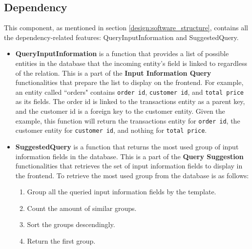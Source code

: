\subsection{Dependency}
\label{backend_dependency}
This component, as mentioned in section \ref{design:software_structure}, contains all the dependency-related features: QueryInputInformation and SuggestedQuery.
\begin{itemize}
    \item \textbf{QueryInputInformation} is a function that provides a list of possible entities in the database that the incoming entity's field is linked to regardless of the relation. This is a part of the \textbf{Input Information Query} functionalities that prepare the list to display on the frontend. For example, an entity called ``orders" contains \verb!order id!, \verb!customer id!, and \verb!total price! as its fields. The order id is linked to the transactions entity as a parent key, and the customer id is a foreign key to the customer entity. Given the example, this function will return the transactions entity for \verb!order id!, the customer entity for \verb!customer id!, and nothing for \verb!total price!.
    \item \textbf{SuggestedQuery} is a function that returns the most used group of input information fields in the database. This is a part of the \textbf{Query Suggestion} functionalities that retrieves the set of input information fields to display in the frontend. To retrieve the most used group from the database is as follows:
    \begin{enumerate}
        \item Group all the queried input information fields by the template.
        \item Count the amount of similar groups.
        \item Sort the groups descendingly.
        \item Return the first group.
    \end{enumerate}
    
\end{itemize}



